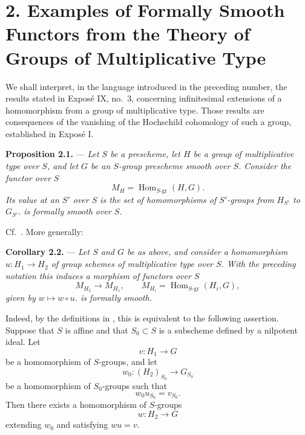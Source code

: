 
\section*{2. Examples of Formally Smooth Functors from the Theory of
Groups of Multiplicative Type}

We shall interpret, in the language introduced in the preceding
number, the results stated in Exposé IX, no.~3, concerning
infinitesimal extensions of a homomorphism from a group of
multiplicative type.  Those results are consequences of the
vanishing of the Hochschild cohomology of such a group, established
in Exposé I.

\medskip
\noindent{}\textbf{Proposition 2.1.} ---
\textit{Let \(S\) be a prescheme, let \(H\) be a group of
multiplicative type over \(S\), and let \(G\) be an \(S\)-group
prescheme smooth over \(S\).  Consider the functor over \(S\)}
\[
  M_H=\operatorname{Hom}_{S\text{-}\mathrm{gr}}(H,G).
\]
\textit{Its value at an \(S'\) over \(S\) is the set of
homomorphisms of \(S'\)-groups from \(H_{S'}\) to \(G_{S'}\).
 is formally smooth over \(S\).}

Cf.\ .  More generally:

\medskip
\noindent{}\textbf{Corollary 2.2.} ---
\textit{Let \(S\) and \(G\) be as above, and consider a homomorphism
\(u:H_1\to H_2\) of group schemes of multiplicative type over \(S\).
With the preceding notation this induces a morphism of functors over
\(S\)}
\[
  M_{H_2}\longrightarrow M_{H_1},
  \qquad
  M_{H_i}=\operatorname{Hom}_{S\text{-}\mathrm{gr}}(H_i,G),
\]
\textit{given by \(w\mapsto w\circ u\).   is formally
smooth.}

Indeed, by the definitions in
, this is equivalent to the
following assertion.  Suppose that \(S\) is affine and that
\(S_0\subset S\) is a subscheme defined by a nilpotent ideal.  Let
\[
  v:H_1\longrightarrow G
\]
be a homomorphism of \(S\)-groups, and let
\[
  w_0:(H_2)_{S_0}\longrightarrow G_{S_0}
\]
be a homomorphism of \(S_0\)-groups such that
\[
  w_0u_{S_0}=v_{S_0}.
\]
Then there exists a homomorphism of \(S\)-groups
\[
  w:H_2\longrightarrow G
\]
extending \(w_0\) and satisfying \(wu=v\).

